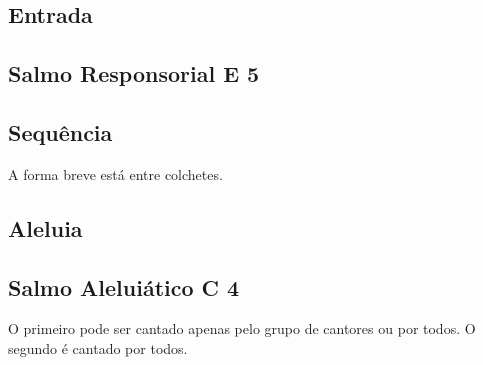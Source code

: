 
\subsection{Entrada}\label{subsection:tempus-per-annum/sanctissimi-corporis-et-sanguinis-christi/psalmi-ad-introitum}

\AllowPageFlush

\subsection[Salmo Responsorial]{Salmo Responsorial \textmd{E 5}}\label{subsection:tempus-per-annum/sanctissimi-corporis-et-sanguinis-christi/psalmus-responsorius}

\subsection{Sequência}\label{subsection:tempus-per-annum/sanctissimi-corporis-et-sanguinis-christi/sequentia}
\begin{rubrica}
  A forma breve está entre colchetes.
\end{rubrica}

\subsection{Aleluia}\label{subsection:tempus-per-annum/sanctissimi-corporis-et-sanguinis-christi/alleluia}

\AllowPageFlush

\subsection[Salmo Aleluiático]{Salmo Aleluiático \textmd{C 4}}\label{subsection:tempus-per-annum/sanctissimi-corporis-et-sanguinis-christi/psalmus-alleluiaticus}
\begin{rubrica}
  O primeiro {\normalfont\Rbar} pode ser cantado apenas pelo grupo de cantores ou por todos. O segundo {\normalfont\Rbar} é cantado por todos.
\end{rubrica}

